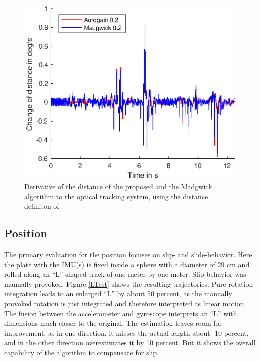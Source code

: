 \documentclass[letterpaper, 10 pt, conference]{ieeeconf}  %
\begin{document}
\begin{figure}
\includegraphics[width=\linewidth]{./graphics/diffdistance.eps}
\caption{Derivative of the distance of the proposed and the Madgwick algorithm to the optical tracking system, using the distance definiton of \cite{kuffner2004effectiveDistance}}
\label{diffdistance}
\end{figure}


\subsection{Position}
The primary evaluation for the position focuses on slip- and slide-behavior.
Here the plate with the IMU(s) is fixed inside a sphere with a diameter of 29 cm and rolled along an ``L''-shaped track of one meter by one meter.
Slip behavior was manually provoked.
Figure \ref{LTest} shows the resulting trajectories.
Pure rotation integration leads to an enlarged ``L'' by about 50 percent, as the manually provoked rotation is just integrated and therefore interpreted as linear motion.
The fusion between the accelerometer and gyroscope interprets an ``L'' with dimensions much closer to the original.
The estimation leaves room for improvement, as in one direction, it misses the actual length about -10 percent, and in the other direction overestimates it by 10 percent.
But it shows the overall capability of the algorithm to compensate for slip. 
\end{document}
